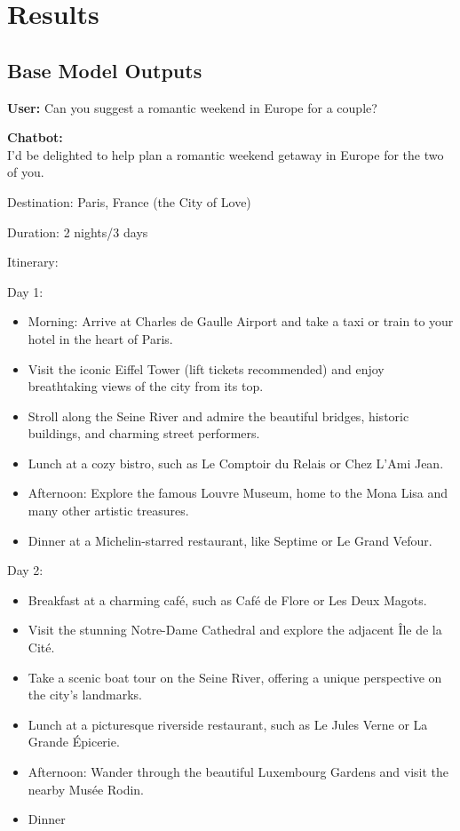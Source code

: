 \documentclass[fleqn,moreauthors,10pt]{ds_report}
\begin{document}
\section*{Results}
\subsection*{Base Model Outputs}
\begin{tcolorbox}[
    colback=gray!5,
    colframe=black!80,
    title=Base Model Output - Itinerary,
    arc=2mm,
    before skip=0pt,
    label={box:base-model-itinerary}
]

\textbf{User:} Can you suggest a romantic weekend in Europe for a couple?

\vspace{0.3cm}

\textbf{Chatbot:} \\
I'd be delighted to help plan a romantic weekend getaway in Europe for the two of you.

Destination: Paris, France (the City of Love)

Duration: 2 nights/3 days

Itinerary:

Day 1:
\begin{itemize}[noitemsep, topsep=0pt]
    \item Morning: Arrive at Charles de Gaulle Airport and take a taxi or train to your hotel in the heart of Paris.
    \item Visit the iconic Eiffel Tower (lift tickets recommended) and enjoy breathtaking views of the city from its top.
    \item Stroll along the Seine River and admire the beautiful bridges, historic buildings, and charming street performers.
    \item Lunch at a cozy bistro, such as Le Comptoir du Relais or Chez L'Ami Jean.
    \item Afternoon: Explore the famous Louvre Museum, home to the Mona Lisa and many other artistic treasures.
    \item Dinner at a Michelin-starred restaurant, like Septime or Le Grand Vefour.
\end{itemize}

Day 2:
\begin{itemize}[noitemsep, topsep=0pt]
    \item Breakfast at a charming café, such as Café de Flore or Les Deux Magots.
    \item Visit the stunning Notre-Dame Cathedral and explore the adjacent Île de la Cité.
    \item Take a scenic boat tour on the Seine River, offering a unique perspective on the city's landmarks.
    \item Lunch at a picturesque riverside restaurant, such as Le Jules Verne or La Grande Épicerie.
    \item Afternoon: Wander through the beautiful Luxembourg Gardens and visit the nearby Musée Rodin.
    \item Dinner
\end{itemize}


\end{tcolorbox}
\end{document}

